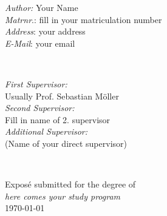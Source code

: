 \begin{titlepage}
\begin{minipage}{0.5\textwidth}
\begin{flushleft} \large
\emph{Author:} Your Name\\
\emph{Matrnr}.: fill in your matriculation number\\
\emph{Address}: your address \\
\emph{E-Mail}: your email\\
\end{flushleft}
\end{minipage}
~
\begin{minipage}{0.43\textwidth}
\begin{flushright} \large
\emph{First Supervisor:} \\
Usually Prof. Sebastian Möller\\
\emph{Second Supervisor:} \\
Fill in name of 2. supervisor\\
\emph{Additional Supervisor:}\\
(Name of your direct supervisor)
\end{flushright}
\end{minipage}\\[3cm]
\makeatother


{\large Exposé submitted for the degree of}\\[0.5cm]
{\large \emph{here comes your study program}}\\[0.5cm]
{\large \today}\\[2cm] %

\vfill %

\end{titlepage}
